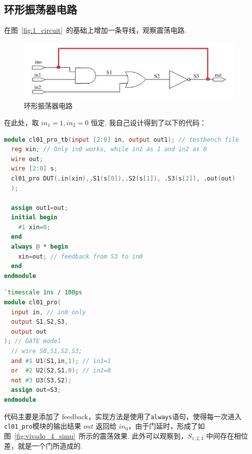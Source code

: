 \documentclass[11pt]{SEU-Digital-Report}
\begin{document}
            \subsection{环形振荡器电路}

            在图~\ref{fig:1_circuit}~的基础上增加一条导线，观察震荡电路.

            \begin{figure}[htbp]
                \centering
                \includegraphics[width=.5\linewidth]{fig/3logic_.jpg}
                \caption{环形振荡器电路\cite{guide}}
                \label{fig:1_circuit_}
            \end{figure}

            在此处，取 $in_1=1, in_2=0$ 恒定.
            我自己设计得到了以下的代码：

            \begin{lstlisting}[language=verilog, title=cl01\_pro\_tb.v]
module cl01_pro_tb(input [2:0] in, output out1); // testbench file
  reg xin; // Only in0 works, while in1 as 1 and in2 as 0
  wire out;
  wire [2:0] s; 
  cl01_pro DUT(.in(xin),.S1(s[0]),.S2(s[1]), .S3(s[2]), .out(out)
  );

  assign out1=out;
  initial begin
    #1 xin=0;
  end
  always @ * begin
    xin=out; // feedback from S3 to in0
  end
endmodule
                \end{lstlisting}
                \begin{lstlisting}[language=verilog, title=cl01\_pro.v]
`timescale 1ns / 100ps 
module cl01_pro( 
  input in, // in0 only
  output S1,S2,S3,
  output out
); // GATE model
  // wire S0,S1,S2,S3;
  and #1 U1(S1,in,1); // in1=1
  or  #2 U2(S2,S1,0); // in2=0
  not #3 U3(S3,S2);
  assign out=S3;
endmodule
                \end{lstlisting}

                \begin{analyze}{}{}
                    代码主要是添加了 feedback，实现方法是使用了\texttt{always}语句，使得每一次进入\texttt{cl01\_pro}模块的输出结果 $out$ 返回给 $in_0$，由于门延时，形成了如图~\ref{fig:vivado_4_simu}~所示的震荡效果.
                    此外可以观察到，$S_{1,2,3}$ 中间存在相位差，就是一个门所造成的.
                \end{analyze}
\end{document}

